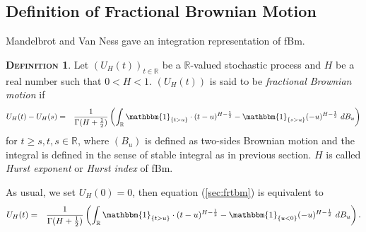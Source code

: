 \documentclass[a4paper, twoside, 11pt]{article}
\theoremstyle{definition}
\newtheorem{definition}{\scshape Definition}[section]
\newcommand{\brkt}[1]{\left({#1} \right)}
\begin{document}
  \subsection{Definition of Fractional Brownian Motion}
  Mandelbrot and Van Ness \cite{mandelbrot} gave an integration representation of fBm.
  \begin{definition}
	Let $(U_H(t))_{t\in \mathbb{R}}$ be a $\mathbb{R}$-valued stochastic process and $H$ be a real number such that $0<H<1$. $(U_H(t))$ is said to be \emph{fractional Brownian motion} if 
	\begin{eqnarray}
	  U_H(t) - U_H(s) &=& \frac{1}{\Gamma(H+\frac{1}{2})}\brkt{\int_{\mathbb{R}} \mathbbm{1}_{\{t > u\}}\cdot (t-u)^{H-\frac{1}{2}} - \mathbbm{1}_{\{s > u\}} (-u)^{H-\frac{1}{2}} \, \mathop{dB_u}}
	  \label{sec:frtbm}
	\end{eqnarray}
	for $t\ge s, t, s \in \mathbb{R}$, where $(B_u)$ is defined as two-sides Brownian motion and the integral is defined in the sense of stable integral as in previous section. $H$ is called \emph{Hurst exponent} or \emph{Hurst index} of fBm.
  \end{definition}

  As usual, we set $U_H(0) = 0$, then equation (\ref{sec:frtbm}) is equivalent to
	   \begin{eqnarray}
		 U_H(t) &=& \frac{1}{\Gamma(H+\frac{1}{2})}\brkt{\int_{\mathbb{R}} \mathbbm{1}_{\{t > u\}}\cdot (t-u)^{H-\frac{1}{2}} - \mathbbm{1}_{\{u < 0\}} (-u)^{H-\frac{1}{2}} \, \mathop{dB_u}}.
	  \label{sec:fbm}
	\end{eqnarray}
\end{document}
